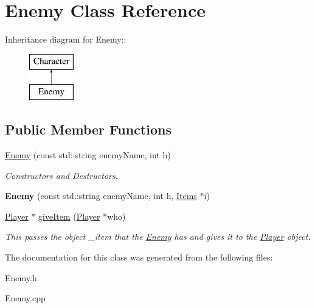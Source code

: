 \hypertarget{classEnemy}{
\section{Enemy Class Reference}
\label{classEnemy}
}
Inheritance diagram for Enemy::\begin{figure}[H]
\begin{center}
\leavevmode
\includegraphics[height=2cm]{classEnemy}
\end{center}
\end{figure}
\subsection*{Public Member Functions}
\begin{DoxyCompactItemize}
\item 
\hypertarget{classEnemy_a3bd848647f3dbab14f8ccf6ecb1a1f17}{
\hyperlink{classEnemy_a3bd848647f3dbab14f8ccf6ecb1a1f17}{Enemy} (const std::string enemyName, int h)}
\label{classEnemy_a3bd848647f3dbab14f8ccf6ecb1a1f17}

\begin{DoxyCompactList}\small\item\em Constructors and Destructors. \item\end{DoxyCompactList}\item 
\hypertarget{classEnemy_a9242db04b8819769567ea7ac831a3081}{
{\bfseries Enemy} (const std::string enemyName, int h, \hyperlink{classItems}{Items} $\ast$i)}
\label{classEnemy_a9242db04b8819769567ea7ac831a3081}

\item 
\hypertarget{classEnemy_a4a2abf29b609f61de397f7b87e9e9085}{
\hyperlink{classPlayer}{Player} $\ast$ \hyperlink{classEnemy_a4a2abf29b609f61de397f7b87e9e9085}{giveItem} (\hyperlink{classPlayer}{Player} $\ast$who)}
\label{classEnemy_a4a2abf29b609f61de397f7b87e9e9085}

\begin{DoxyCompactList}\small\item\em This passes the object \_\-item that the \hyperlink{classEnemy}{Enemy} has and gives it to the \hyperlink{classPlayer}{Player} object. \item\end{DoxyCompactList}\end{DoxyCompactItemize}


The documentation for this class was generated from the following files:\begin{DoxyCompactItemize}
\item 
Enemy.h\item 
Enemy.cpp\end{DoxyCompactItemize}
